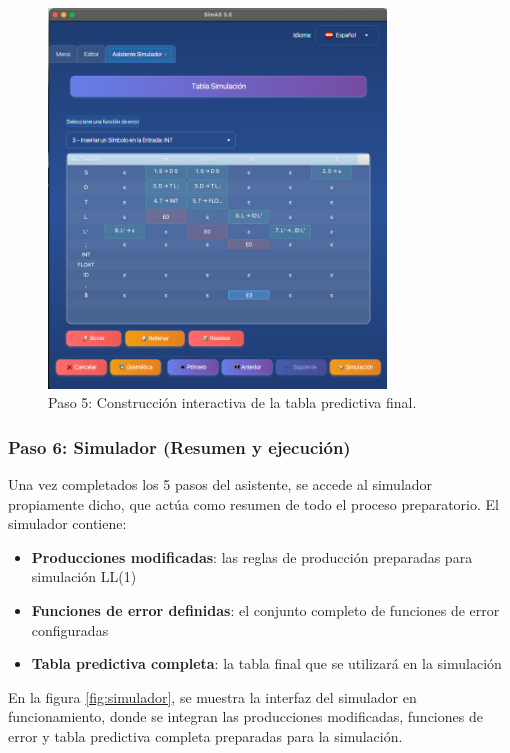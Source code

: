\needspace{6cm}
\begin{figure}[H]
\centering
\includegraphics[width=0.8\textwidth]{figuras2/simulador/paso5_tablaPredictivaCompleta.png}
\caption{Paso 5: Construcción interactiva de la tabla predictiva final.}
\label{fig:paso5_sim}
\end{figure}

\subsubsection{Paso 6: Simulador (Resumen y ejecución)}

Una vez completados los 5 pasos del asistente, se accede al simulador propiamente dicho, que actúa como resumen de todo el proceso preparatorio. El simulador contiene:

\begin{itemize}
 \item \textbf{Producciones modificadas}: las reglas de producción preparadas para simulación LL(1)
 \item \textbf{Funciones de error definidas}: el conjunto completo de funciones de error configuradas
 \item \textbf{Tabla predictiva completa}: la tabla final que se utilizará en la simulación
\end{itemize}

En la figura \ref{fig:simulador}, se muestra la interfaz del simulador en funcionamiento, donde se integran las producciones modificadas, funciones de error y tabla predictiva completa preparadas para la simulación.

